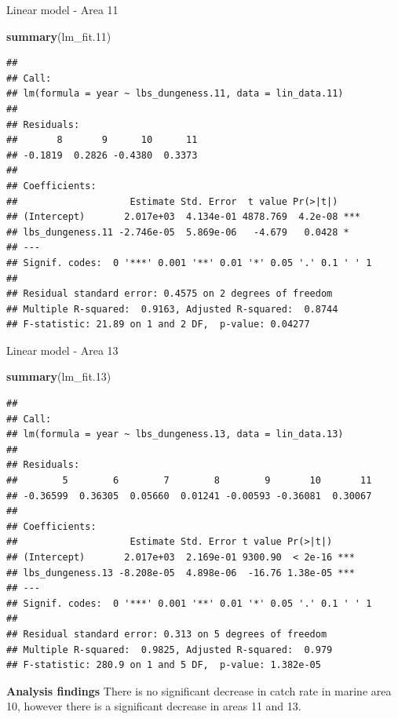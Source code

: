 \documentclass[ignorenonframetext,]{beamer}
\newenvironment{Shaded}{\begin{snugshade}}{\end{snugshade}}
\newcommand{\KeywordTok}[1]{\textcolor[rgb]{0.13,0.29,0.53}{\textbf{#1}}}
\newcommand{\DecValTok}[1]{\textcolor[rgb]{0.00,0.00,0.81}{#1}}
\newcommand{\NormalTok}[1]{#1}
\begin{document}
\begin{frame}[fragile]{Linear model - Area 11}

\begin{Shaded}
\begin{Highlighting}[]
\KeywordTok{summary}\NormalTok{(lm_fit.}\DecValTok{11}\NormalTok{)}
\end{Highlighting}
\end{Shaded}

\begin{verbatim}
## 
## Call:
## lm(formula = year ~ lbs_dungeness.11, data = lin_data.11)
## 
## Residuals:
##       8       9      10      11 
## -0.1819  0.2826 -0.4380  0.3373 
## 
## Coefficients:
##                    Estimate Std. Error  t value Pr(>|t|)    
## (Intercept)       2.017e+03  4.134e-01 4878.769  4.2e-08 ***
## lbs_dungeness.11 -2.746e-05  5.869e-06   -4.679   0.0428 *  
## ---
## Signif. codes:  0 '***' 0.001 '**' 0.01 '*' 0.05 '.' 0.1 ' ' 1
## 
## Residual standard error: 0.4575 on 2 degrees of freedom
## Multiple R-squared:  0.9163, Adjusted R-squared:  0.8744 
## F-statistic: 21.89 on 1 and 2 DF,  p-value: 0.04277
\end{verbatim}

\end{frame}

\begin{frame}[fragile]{Linear model - Area 13}

\begin{Shaded}
\begin{Highlighting}[]
\KeywordTok{summary}\NormalTok{(lm_fit.}\DecValTok{13}\NormalTok{)}
\end{Highlighting}
\end{Shaded}

\begin{verbatim}
## 
## Call:
## lm(formula = year ~ lbs_dungeness.13, data = lin_data.13)
## 
## Residuals:
##        5        6        7        8        9       10       11 
## -0.36599  0.36305  0.05660  0.01241 -0.00593 -0.36081  0.30067 
## 
## Coefficients:
##                    Estimate Std. Error t value Pr(>|t|)    
## (Intercept)       2.017e+03  2.169e-01 9300.90  < 2e-16 ***
## lbs_dungeness.13 -8.208e-05  4.898e-06  -16.76 1.38e-05 ***
## ---
## Signif. codes:  0 '***' 0.001 '**' 0.01 '*' 0.05 '.' 0.1 ' ' 1
## 
## Residual standard error: 0.313 on 5 degrees of freedom
## Multiple R-squared:  0.9825, Adjusted R-squared:  0.979 
## F-statistic: 280.9 on 1 and 5 DF,  p-value: 1.382e-05
\end{verbatim}

\textbf{Analysis findings} There is no significant decrease in catch
rate in marine area 10, however there is a significant decrease in areas
11 and 13.

\end{frame}
\end{document}
